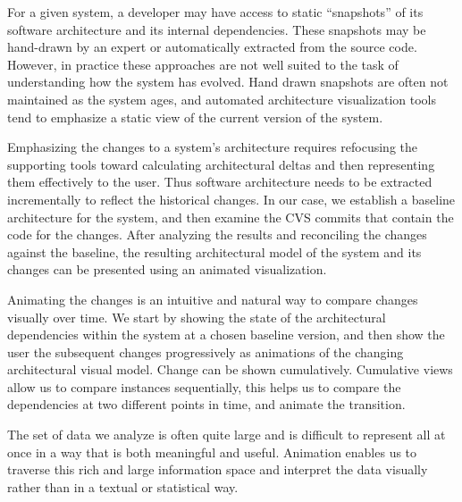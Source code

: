 \documentclass[times, 10pt,twocolumn]{article}
\begin{document}
For a given system, a developer may have access to static
``snapshots'' of its software architecture and its internal
dependencies.  These snapshots may be hand-drawn by an expert or
automatically extracted from the source code.  However, in practice
these approaches are not well suited to the task of understanding how
the system has evolved. Hand drawn snapshots are often not maintained
as the system ages, and automated architecture visualization tools
tend to emphasize a static view of the current version of the system.

Emphasizing the changes to a system's architecture requires refocusing
the supporting tools toward calculating architectural deltas and then
representing them effectively to the user.  Thus software architecture
needs to be extracted incrementally to reflect the historical changes.
In our case, we establish a baseline architecture for the system, and
then examine the CVS commits that contain the code for the changes.
After analyzing the results and reconciling the changes against the
baseline, the resulting architectural model of the system and its
changes can be presented using an animated visualization.

Animating the changes is an intuitive and natural way to compare
changes visually over time.  We start by showing the state of the
architectural dependencies within the system at a chosen baseline
version, and then show the user the subsequent changes progressively
as animations of the changing architectural visual model.  Change can
be shown cumulatively.  Cumulative views allow us to compare instances
sequentially, this helps us to compare the dependencies at two
different points in time, and animate the transition.






The set of data we analyze is often quite large and is difficult to
represent all at once in a way that is both meaningful and useful.
Animation enables us to traverse this rich and large information space
and interpret the data visually rather than in a textual or
statistical way.
\end{document}
